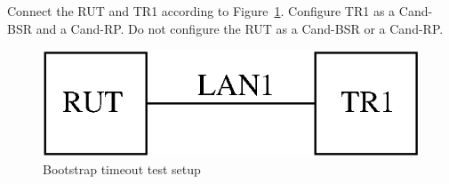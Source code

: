 \documentclass[11pt]{report}
\begin{document}
Connect the RUT and TR1 according to Figure~\ref{fig:bootstrap_timeout}.
Configure TR1 as a Cand-BSR and a Cand-RP. Do not configure the RUT as a
Cand-BSR or a Cand-RP.

\begin{figure}[htbp]
  \begin{center}
    \includegraphics[scale=0.8]{figs/pim_test_6_3_bootstrap_timeout}
    \caption{Bootstrap timeout test setup}
    \label{fig:bootstrap_timeout}
  \end{center}
\end{figure}
\end{document}
